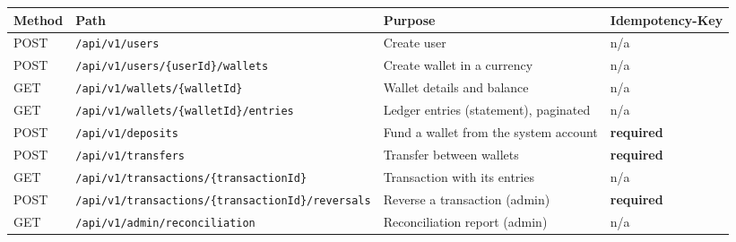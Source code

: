 \documentclass[11pt,a4paper]{article}
\newcounter{none} %
\begin{document}
{\def\LTcaptype{none} %
\begin{longtable}[]{@{}
  >{\raggedright\arraybackslash}p{}
  >{\raggedright\arraybackslash}p{}
  >{\raggedright\arraybackslash}p{}
  >{\raggedright\arraybackslash}p{}@{}}
\toprule\noalign{}
\begin{minipage}[b]{\linewidth}\raggedright
Method
\end{minipage} & \begin{minipage}[b]{\linewidth}\raggedright
Path
\end{minipage} & \begin{minipage}[b]{\linewidth}\raggedright
Purpose
\end{minipage} & \begin{minipage}[b]{\linewidth}\raggedright
Idempotency-Key
\end{minipage} \\
\midrule\noalign{}
\endhead
\bottomrule\noalign{}
\endlastfoot
POST & \texttt{/\allowbreak{}api/\allowbreak{}v1/\allowbreak{}users} & Create user & n/a \\
POST & \texttt{/\allowbreak{}api/\allowbreak{}v1/\allowbreak{}users/\allowbreak{}\{userId\}/\allowbreak{}wallets} & Create wallet in a currency & n/a \\
GET & \texttt{/\allowbreak{}api/\allowbreak{}v1/\allowbreak{}wallets/\allowbreak{}\{walletId\}} & Wallet details and balance & n/a \\
GET & \texttt{/\allowbreak{}api/\allowbreak{}v1/\allowbreak{}wallets/\allowbreak{}\{walletId\}/\allowbreak{}entries} & Ledger entries (statement), paginated & n/a \\
POST & \texttt{/\allowbreak{}api/\allowbreak{}v1/\allowbreak{}deposits} & Fund a wallet from the system account & \textbf{required} \\
POST & \texttt{/\allowbreak{}api/\allowbreak{}v1/\allowbreak{}transfers} & Transfer between wallets & \textbf{required} \\
GET & \texttt{/\allowbreak{}api/\allowbreak{}v1/\allowbreak{}transactions/\allowbreak{}\{transactionId\}} & Transaction with its entries & n/a \\
POST & \texttt{/\allowbreak{}api/\allowbreak{}v1/\allowbreak{}transactions/\allowbreak{}\{transactionId\}/\allowbreak{}reversals} & Reverse a transaction (admin) & \textbf{required} \\
GET & \texttt{/\allowbreak{}api/\allowbreak{}v1/\allowbreak{}admin/\allowbreak{}reconciliation} & Reconciliation report (admin) & n/a \\
\end{longtable}
}
\end{document}
